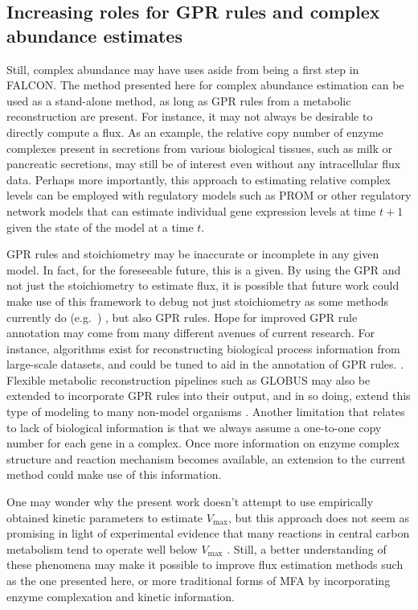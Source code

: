 \subsection{Increasing roles for GPR rules and complex abundance estimates}
Still, complex abundance may have uses aside from being a first
step in FALCON. The method presented here for complex abundance
estimation can be used as a stand-alone method, as long as GPR
rules from a metabolic reconstruction are present. For instance, it
may not always be desirable to directly compute a flux. As an example,
the relative copy number of enzyme complexes present in secretions
from various biological tissues, such as milk or pancreatic
secretions, may still be of interest even without any intracellular
flux data.  Perhaps more importantly, this approach to estimating
relative complex levels can be employed with regulatory models such as
PROM \citep{Chandrasekaran2010a} or other regulatory network models
that can estimate individual gene expression levels at time $t+1$
given the state of the model at a time $t$.

GPR rules and stoichiometry may be inaccurate or
incomplete in any given model. In fact, for the foreseeable future,
this is a given. By using the GPR and not just the stoichiometry to
estimate flux, it is possible that future work could make use of this
framework to debug not just stoichiometry as some methods currently do
(e.g.\ \citealt{Reed14112006}) , but also GPR rules.  Hope for
improved GPR rule annotation may come from many different avenues of
current research. For instance, algorithms exist for reconstructing
biological process information from large-scale datasets, and could be
tuned to aid in the annotation of GPR rules.
\citep{Mitra2013}. Flexible metabolic reconstruction pipelines such as
GLOBUS may also be extended to incorporate GPR rules into their output, and
in so doing, extend this type of modeling to many non-model organisms
\citep{Plata2012}.  Another limitation that relates to lack of
biological information is that we always assume a one-to-one copy
number for each gene in a complex. Once more information on enzyme
complex structure and reaction mechanism becomes available, an
extension to the current method could make use of this information.

One may wonder why the present work doesn't attempt to use empirically
obtained kinetic parameters to estimate $V_{\max}$, but this approach
does not seem as promising in light of experimental evidence that many
reactions in central carbon metabolism tend to operate well below
$V_{\max}$ \citep{Bennett2009}. Still, a better understanding of these
phenomena may make it possible to improve flux estimation methods such
as the one presented here, or more traditional forms of MFA
\citep{Shestov2013a} by incorporating enzyme complexation and kinetic
information.

